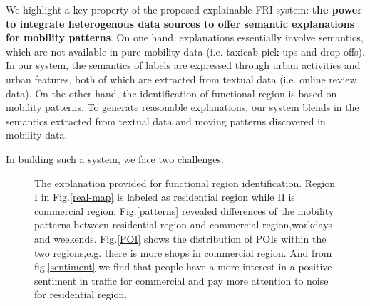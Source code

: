 \documentclass[runningheads]{llncs}
\begin{document}
We highlight a key property of the proposed explainable FRI system: \textbf{the power to integrate heterogenous data sources to offer semantic explanations for mobility patterns}. On one hand, explanations essentially involve semantics, which are not available in pure mobility data (i.e. taxicab pick-ups and drop-offs). In our system, the semantics of labels are expressed through urban activities and urban features, both of which are extracted from textual data (i.e. online review data). On the other hand, the identification of functional region is based on mobility patterns. To generate reasonable explanations, our system blends in the semantics extracted from textual data and moving patterns discovered in mobility data. 

In building such a system, we face two challenges.

\begin{figure}
\centering
{}
\caption{The explanation provided for functional region identification.
Region I in Fig.\ref{real-map} is labeled as residential region while II is commercial region.
Fig.\ref{patterns} revealed differences of the mobility patterns between residential region and commercial region,workdays and weekends.
Fig.\ref{POI} shows the distribution of POIs within the two regions,e.g. there is more shops in commercial region.
And from fig.\ref{sentiment} we find that people have a more interest in a positive sentiment in traffic for commercial and pay more attention to noise for residential region.}
\label{explanation-example} %
\end{figure}
\end{document}
